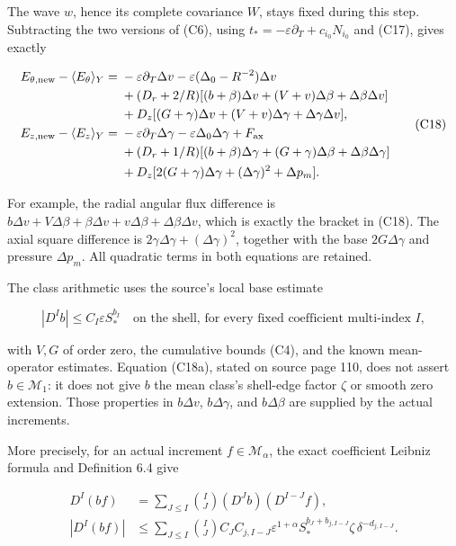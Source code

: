 \documentclass[10pt,a4paper]{article}
\begin{document}
The wave \(w\), hence its complete covariance \(W\), stays fixed during this step. Subtracting the two versions of (C6), using \(t_*=-\varepsilon\partial_T+c_{i_0}N_{i_0}\) and (C17), gives exactly

\[
\begin{aligned}
E_{\theta,\mathrm{new}}-\langle E_\theta\rangle_Y
={}&-\varepsilon\partial_T\Delta v-\varepsilon(\Delta_0-R^{-2})\Delta v\\
&+(D_r+2/R)[(b+\beta)\Delta v+(V+v)\Delta\beta+\Delta\beta\Delta v]\\
&+D_z[(G+\gamma)\Delta v+(V+v)\Delta\gamma+\Delta\gamma\Delta v],\\
E_{z,\mathrm{new}}-\langle E_z\rangle_Y
={}&-\varepsilon\partial_T\Delta\gamma-\varepsilon\Delta_0\Delta\gamma+F_{\rm ax}\\
&+(D_r+1/R)[(b+\beta)\Delta\gamma+(G+\gamma)\Delta\beta+\Delta\beta\Delta\gamma]\\
&+D_z[2(G+\gamma)\Delta\gamma+(\Delta\gamma)^2+\Delta p_m].
\end{aligned}
\tag{C18}
\]

For example, the radial angular flux difference is \(b\Delta v+V\Delta\beta+\beta\Delta v+v\Delta\beta+\Delta\beta\Delta v\), which is exactly the bracket in (C18). The axial square difference is \(2\gamma\Delta\gamma+(\Delta\gamma)^2\), together with the base \(2G\Delta\gamma\) and pressure \(\Delta p_m\). All quadratic terms in both equations are retained.

The class arithmetic uses the source's local base estimate

\[
|D^I b|\le C_I\varepsilon S_*^{b_I}
\quad\text{on the shell, for every fixed coefficient multi-index }I,
\tag{C18a}
\]

with \(V,G\) of order zero, the cumulative bounds (C4), and the known mean-operator estimates. Equation (C18a), stated on source page 110, does not assert \(b\in\mathcal M_1\): it does not give \(b\) the mean class's shell-edge factor \(\zeta\) or smooth zero extension. Those properties in \(b\Delta v\), \(b\Delta\gamma\), and \(b\Delta\beta\) are supplied by the actual increments.

More precisely, for an actual increment \(f\in\mathcal M_\alpha\), the exact coefficient Leibniz formula and Definition 6.4 give

\[
\begin{aligned}
D^I(bf)&=\sum_{J\le I}\binom IJ(D^Jb)(D^{I-J}f),\\
|D^I(bf)|&\le\sum_{J\le I}\binom IJ
C_JC_{j,I-J}\varepsilon^{1+\alpha}
S_*^{b_J+b_{j,I-J}}\zeta\,\delta^{-d_{j,I-J}}.
\end{aligned}
\tag{C18b}
\]
\end{document}
